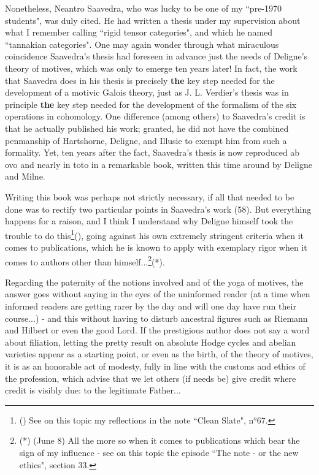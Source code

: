 Nonetheless, Neantro Saavedra, who was lucky to be one of my ``pre-1970 students", was duly cited. He had written a thesis under my supervision about what I remember calling ``rigid tensor categories", and which he named ``tannakian categories". One may again wonder through what miraculous coincidence Saavedra's thesis had foreseen in advance just the needs of Deligne's theory of motives, which was only to emerge ten years later! In fact, the work that Saavedra does in his thesis is precisely \textbf{the} key step needed for the development of a motivic Galois theory, just as J. L. Verdier's thesis was in principle \textbf{the} key step needed for the development of the formalism of the six operations in cohomology. One difference (among others) to Saavedra's credit is that he actually published his work; granted, he did not have the combined penmanship of Hartshorne, Deligne, and Illusie to exempt him from such a formality. Yet, ten years after the fact, Saavedra's thesis is now reproduced ab ovo and nearly in toto in a remarkable book, written this time around by Deligne and Milne. 

Writing this book was perhaps not strictly necessary, if all that needed to be done was to rectify two particular points in Saavedra's work (58). But everything happens for a raison, and I think I understand why Deligne himself took the trouble to do this\footnote{() See on this topic my reflections in the note ``Clean Slate", n$^o 67$.}(), going against his own extremely stringent criteria when it comes to publications, which he is known to apply with exemplary rigor when it comes to authors other than himself...\footnote{(*) (June 8) All the more so when it comes to publications which bear the sign of my influence - see on this topic the episode ``The note - or the new ethics", section 33.}(*).

Regarding the paternity of the notions involved and of the yoga of motives, the answer goes without saying in the eyes of the uninformed reader (at a time when informed readers are getting rarer by the day and will one day have run their course...) - and this without having to disturb ancestral figures such as Riemann and Hilbert or even the good Lord. If the prestigious author does not say a word about filiation, letting the pretty result on absolute Hodge cycles and abelian varieties appear as a starting point, or even as the birth, of the theory of motives, it is as an honorable act of modesty, fully in line with the customs and ethics of the profession, which advise that we let others (if needs be) give credit where credit is visibly due: to the legitimate Father...


